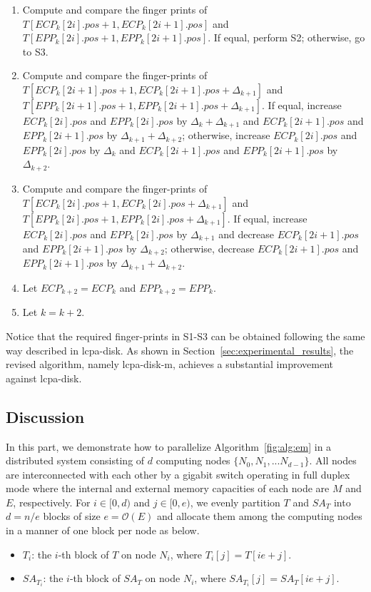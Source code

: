 \documentclass{llncs}
\begin{document}
\begin{enumerate}[S1.]
\item Compute and compare the finger prints of $T[ECP_k[2i].pos+1,ECP_k[2i+1].pos]$ and $T[EPP_k[2i].pos+1,EPP_k[2i+1].pos]$. If equal, perform S2; otherwise, go to S3.
\item Compute and compare the finger-prints of $T[ECP_k[2i+1].pos+1,ECP_k[2i+1].pos+\Delta_{k+1}]$ and $T[EPP_k[2i+1].pos+1,EPP_k[2i+1].pos+\Delta_{k+1}]$. If equal, increase $ECP_k[2i].pos$ and $EPP_k[2i].pos$ by $\Delta_{k}+\Delta_{k+1}$ and $ECP_k[2i+1].pos$ and $EPP_k[2i+1].pos$ by $\Delta_{k+1}+\Delta_{k+2}$; otherwise, increase $ECP_k[2i].pos$ and $EPP_k[2i].pos$ by $\Delta_{k}$ and $ECP_k[2i+1].pos$ and $EPP_k[2i+1].pos$ by $\Delta_{k+2}$.
\item Compute and compare the finger-prints of $T[ECP_k[2i].pos+1,ECP_k[2i].pos+\Delta_{k+1}]$ and $T[EPP_k[2i].pos+1,EPP_k[2i].pos+\Delta_{k+1}]$. If equal, increase $ECP_k[2i].pos$ and $EPP_k[2i].pos$ by $\Delta_{k+1}$ and decrease $ECP_k[2i+1].pos$ and $EPP_k[2i+1].pos$ by $\Delta_{k+2}$; otherwise, decrease $ECP_k[2i+1].pos$ and $EPP_k[2i+1].pos$ by $\Delta_{k+1}+\Delta_{k+2}$.
\item Let $ECP_{k+2}=ECP_{k}$ and $EPP_{k+2}=EPP_{k}$.
\item Let $k = k+2$.
\end{enumerate}

Notice that the required finger-prints in S1-S3 can be obtained following the same way described in lcpa-disk. As shown in Section~\ref{sec:experimental_results}, the revised algorithm, namely lcpa-disk-m, achieves a substantial improvement against lcpa-disk.

\subsection{Discussion}\label{subsec:discussions}

In this part, we demonstrate how to parallelize Algorithm~\ref{fig:alg:em} in a distributed system consisting of $d$ computing nodes $\{N_0, N_1, ...N_{d-1}\}$. All nodes are interconnected with each other by a gigabit switch operating in full duplex mode where the internal and external memory capacities of each node are $M$ and $E$, respectively.
For $i\in [0,d)$ and $j\in [0,e)$, we evenly partition $T$ and $SA_T$ into $d=n/e$ blocks of size $e=\mathcal{O}(E)$ and allocate them among the computing nodes in a manner of one block per node as below.

\begin{itemize}
\item $T_i$: the $i$-th block of $T$ on node $N_i$, where $T_i[j] = T[ie+j]$.
\item $SA_{T_i}$: the $i$-th block of $SA_T$ on node $N_i$, where $SA_{T_i}[j] = SA_T[ie+j]$.
\end{itemize}
\end{document}

